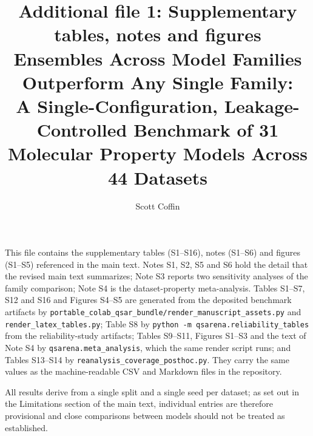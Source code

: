 \documentclass[11pt,a4paper]{article}
\title{Additional file 1: Supplementary tables, notes and figures\\[0.4em]
\large Ensembles Across Model Families Outperform Any Single Family:\\
A Single-Configuration, Leakage-Controlled Benchmark of 31 Molecular Property Models Across 44 Datasets}
\author{Scott Coffin}
\date{}
\begin{document}
\maketitle

This file contains the supplementary tables (S1--S16), notes (S1--S6) and figures (S1--S5) referenced in the main
text. Notes S1, S2, S5 and S6 hold the detail that the revised main text summarizes; Note S3 reports two sensitivity
analyses of the family comparison; Note S4 is the dataset-property meta-analysis. Tables S1--S7, S12 and S16 and Figures S4--S5 are generated
from the deposited benchmark artifacts by \texttt{portable\_colab\_qsar\_bundle/render\_manuscript\_assets.py} and
\texttt{render\_latex\_tables.py}; Table S8 by \texttt{python -m qsarena.reliability\_tables} from the
reliability-study artifacts; Tables S9--S11, Figures S1--S3 and the text of Note S4 by \texttt{qsarena.meta\_analysis},
which the same render script runs; and Tables S13--S14 by \texttt{reanalysis\_coverage\_posthoc.py}. They carry the
same values as the machine-readable CSV and Markdown files in the repository.

All results derive from a single split and a single seed per dataset; as set out in the Limitations section of the
main text, individual entries are therefore provisional and close comparisons between models should not be treated
as established.

\clearpage


\clearpage


\clearpage


\clearpage


\clearpage


\clearpage


\clearpage


\clearpage
\begin{landscape}

\end{landscape}

\clearpage

\end{document}
